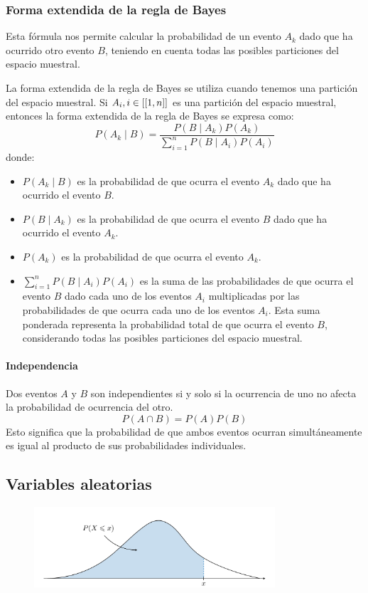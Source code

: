 \subsubsection{Forma extendida de la regla de Bayes}
Esta fórmula nos permite calcular la probabilidad de un evento $A_k$ dado que ha ocurrido otro evento $B$, teniendo en cuenta todas las posibles particiones del espacio muestral.

La forma extendida de la regla de Bayes se utiliza cuando tenemos una partición del espacio muestral. Si $\\{A_{i}, i \in [[1, n]]}$ es una partición del espacio muestral, entonces la forma extendida de la regla de Bayes se expresa como:
$$P(A_k \mid B) = \frac{P(B \mid A_k) P(A_k)}{\sum_{i=1}^{n} P(B \mid A_i) P(A_i)}$$
donde:
\begin{itemize}
\item $P(A_{k} \mid B)$ es la probabilidad de que ocurra el evento $A_k$ dado que ha ocurrido el evento $B$.
\item $P(B \mid A_{k})$ es la probabilidad de que ocurra el evento $B$ dado que ha ocurrido el evento $A_k$.
\item $P(A_{k})$ es la probabilidad de que ocurra el evento $A_k$.
\item $\sum_{i=1}^{n} P(B \mid A_i) P(A_i)$ es la suma de las probabilidades de que ocurra el evento $B$ dado cada uno de los eventos $A_i$ multiplicadas por las probabilidades de que ocurra cada uno de los eventos $A_i$. Esta suma ponderada representa la probabilidad total de que ocurra el evento $B$, considerando todas las posibles particiones del espacio muestral.
\end{itemize}

\paragraph{Independencia}
Dos eventos $A$ y $B$ son independientes si y solo si la ocurrencia de uno no afecta la probabilidad de ocurrencia del otro.
$$P(A \cap B) = P(A)P(B)$$
Esto significa que la probabilidad de que ambos eventos ocurran simultáneamente es igual al producto de sus probabilidades individuales.

\subsection{Variables aleatorias}
\begin{figure}[h]
\centering
\includegraphics[width = 0.8\textwidth]{figs/cdf.png}
\end{figure}


